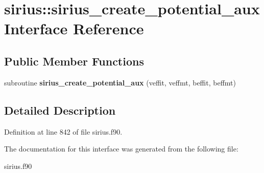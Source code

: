 \hypertarget{interfacesirius_1_1sirius__create__potential__aux}{}\section{sirius\+:\+:sirius\+\_\+create\+\_\+potential\+\_\+aux Interface Reference}
\label{interfacesirius_1_1sirius__create__potential__aux}
\subsection*{Public Member Functions}
\begin{DoxyCompactItemize}
\item 
\hypertarget{interfacesirius_1_1sirius__create__potential__aux_a00d668c7da46e1fc4f64a6b00f7af931}{}subroutine {\bfseries sirius\+\_\+create\+\_\+potential\+\_\+aux} (veffit, veffmt, beffit, beffmt)\label{interfacesirius_1_1sirius__create__potential__aux_a00d668c7da46e1fc4f64a6b00f7af931}

\end{DoxyCompactItemize}


\subsection{Detailed Description}


Definition at line 842 of file sirius.\+f90.



The documentation for this interface was generated from the following file\+:\begin{DoxyCompactItemize}
\item 
sirius.\+f90\end{DoxyCompactItemize}
